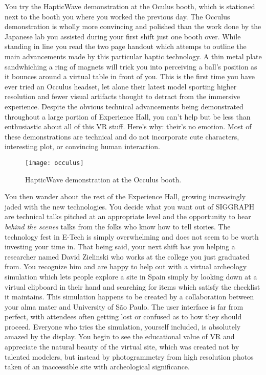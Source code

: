 \documentclass[../main.tex]{subfiles}
\begin{document}
You try the HapticWave demonstration at the Oculus booth, which is stationed next to the booth you where you worked the previous day. The Occulus demonstration is wholly more convincing and polished than the work done by the Japanese lab you assisted during your first shift just one booth over. While standing in line you read the two page handout which attemps to outline the main advancements made by this particular haptic technology. A thin metal plate sandwhiching a ring of magnets will trick you into perceiving a ball's position as it bounces around a virtual table in front of you. This is the first time you have ever tried an Occulus headset, let alone their latest model sporting higher resolution and fewer visual artifacts thought to detract from the immersive experience. Despite the obvious technical advancements being demonstrated throughout a large portion of Experience Hall, you can't help but be less than enthusiastic about all of this VR stuff. Here's why: their's no emotion. Most of these demonstrations are technical and do not incorporate cute characters, interesting plot, or convincing human interaction.

\begin{figure}[h!]
	\centering
	\texttt{[image: occulus]}
	\caption*{HapticWave demonstration at the Occulus booth.}
\end{figure}


You then wander about the rest of the Experience Hall, growing increasingly jaded with the new technologies. You decide what you want out of SIGGRAPH are technical talks pitched at an appropriate level and the opportunity to hear \textit{behind the scenes} talks from the folks who know how to tell stories. The technology fest in E-Tech is simply overwhelming and does not seem to be worth investing your time in. That being said, your next shift has you helping a researcher named David Zielinski who works at the college you just graduated from. You recognize him and are happy to help out with a virtual archeology simulation which lets people explore a site in Spain simply by looking down at a virtual clipboard in their hand and searching for items which satisfy the checklist it maintains. This simulation happens to be created by a collaboration between your alma mater and University of São Paulo. The user interface is far from perfect, with attendees often getting lost or confused as to how they should proceed. Everyone who tries the simulation, yourself included, is absolutely amazed by the display. You begin to see the educational value of VR and appreciate the natural beauty of the virtual site, which was created not by talented modelers, but instead by photogrammetry from high resolution photos taken of an inaccessible site with archeological significance.
\end{document}
